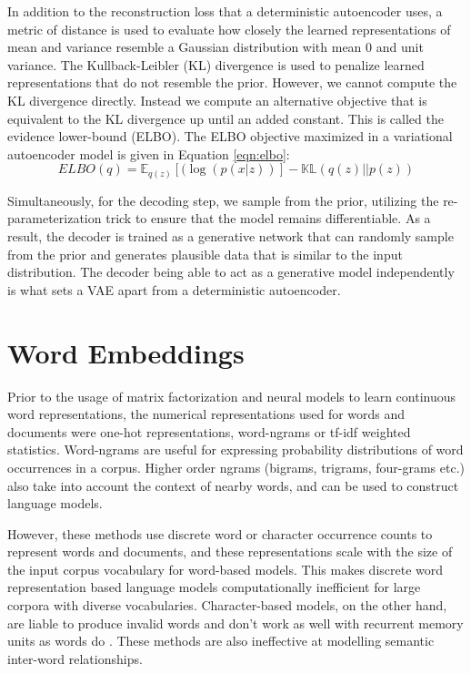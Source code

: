 In addition to the reconstruction loss that a deterministic autoencoder uses, a metric of distance is used to evaluate how closely the learned representations of mean and variance resemble a Gaussian distribution with mean 0 and unit variance. The Kullback-Leibler (KL) divergence \citep{kullback1951information} is used to penalize learned representations that do not resemble the prior. However, we cannot compute the KL divergence directly. Instead we compute an alternative objective that is equivalent to the KL divergence up until an added constant. This is called the evidence lower-bound (ELBO). The ELBO objective maximized in a variational autoencoder model is given in Equation \ref{eqn:elbo}:
\begin{equation} \label{eqn:elbo}
	ELBO(q) = \mathbb{E}_{q(z)} [(\log(p(x|z))] - \mathbb{KL}(q(z)||p(z))
\end{equation}

Simultaneously, for the decoding step, we sample from the prior, utilizing the re-parameterization trick to ensure that the model remains differentiable. As a result, the decoder is trained as a generative network that can randomly sample from the prior and generates plausible data that is similar to the input distribution. The decoder being able to act as a generative model independently is what sets a VAE apart from a deterministic autoencoder.


\section{Word Embeddings}

Prior to the usage of matrix factorization and neural models to learn continuous word representations, the numerical representations used for words and documents were one-hot representations, word-ngrams \citep{brown1992class} or tf-idf weighted statistics. Word-ngrams are useful for expressing probability distributions of word occurrences in a corpus. Higher order ngrams (bigrams, trigrams, four-grams etc.) also take into account the context of nearby words, and can be used to construct language models.

However, these methods use discrete word or character occurrence counts to represent words and documents, and these representations scale with the size of the input corpus vocabulary for word-based models. This makes discrete word representation based language models computationally inefficient for large corpora with diverse vocabularies. Character-based models, on the other hand, are liable to produce invalid words and don't work as well with recurrent memory units as words do \citep{bojanowski2015alternative}. These methods are also ineffective at modelling semantic inter-word relationships.

